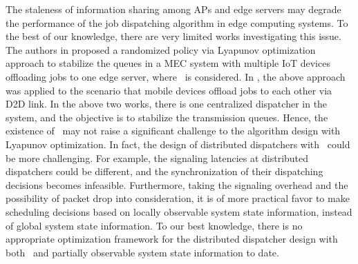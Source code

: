 The staleness of information sharing among APs and edge servers may degrade the performance of the job dispatching algorithm in edge computing systems.
To the best of our knowledge, there are very limited works investigating this issue.
The authors in \cite{JSAC17-LyuX} proposed a randomized policy via Lyapunov optimization approach to stabilize the queues in a MEC system with multiple IoT devices offloading jobs to one edge server, where \brlatency~is considered. 
In \cite{TWC18-LyuX}, the above approach was applied to the scenario that mobile devices offload jobs to each other via D2D link.
In the above two works, there is one centralized dispatcher in the system, and the objective is to stabilize the transmission queues.
Hence, the existence of \brlatency~may not raise a significant challenge to the algorithm design with Lyapunov optimization.
In fact, the design of distributed dispatchers with \brlatency~could be more challenging.
For example, the signaling latencies at distributed dispatchers could be different, and the synchronization of their dispatching decisions becomes infeasible.
Furthermore, taking the signaling overhead and the possibility of packet drop into consideration, it is of more practical favor to make scheduling decisions based on locally observable system state information, instead of global system state information.
To our best knowledge, there is no appropriate optimization framework for the distributed dispatcher design with both \brlatency~and partially observable system state information to date.

